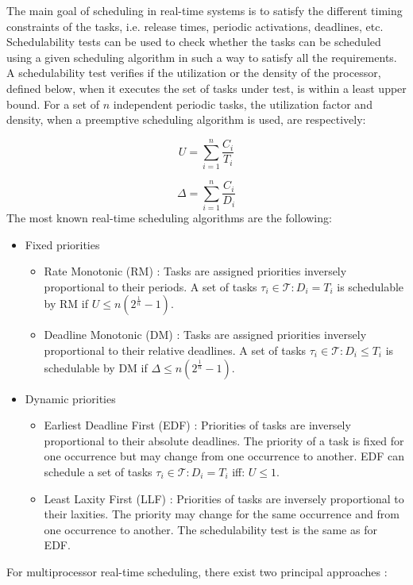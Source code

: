 The main goal of scheduling in real-time systems is to satisfy the different timing constraints of the tasks, i.e. release times, periodic activations, deadlines, etc. Schedulability tests can be used to check whether the tasks can be scheduled using a given scheduling algorithm in such a way to satisfy all the requirements. A schedulability test verifies if the utilization or the density of the processor, defined below, when it executes the set of tasks under test, is within a least upper bound. For a set of $n$ independent periodic tasks, the utilization factor and density, when a preemptive scheduling algorithm is used, are respectively:

\begin{equation}
U = \sum_{i=1}^{n}\frac{C_i}{T_i}
\end{equation}

\begin{equation}
\Delta = \sum_{i=1}^{n}\frac{C_i}{D_i}
\end{equation}
The most known real-time scheduling algorithms are the following:

\begin{itemize}
\item Fixed priorities
\begin{itemize}
\item Rate Monotonic (RM) \cite{liu:1973}: Tasks are assigned priorities inversely proportional to their periods. A set of tasks $\tau_i \in \mathcal{T}: D_i = T_i$ is schedulable by RM if $U \leq n(2^{\frac{1}{n}}-1)$. 
\item Deadline Monotonic (DM) \cite{leung:1982}: Tasks are assigned priorities inversely proportional to their relative deadlines. A set of tasks $\tau_i \in \mathcal{T}: D_i \leq T_i$ is schedulable by DM if $\Delta \leq n(2^{\frac{1}{n}}-1)$. 
\end{itemize}
\item Dynamic priorities
\begin{itemize}
\item Earliest Deadline First (EDF) \cite{liu:1973}: Priorities of tasks are inversely proportional to their absolute deadlines. The priority of a task is fixed for one occurrence but may change from one occurrence to another. EDF can schedule a set of tasks $\tau_i \in \mathcal{T}: D_i = T_i$ iff: $U \leq 1$.
\item Least Laxity First (LLF) \cite{mok:1983}: Priorities of tasks are inversely proportional to their laxities. The priority may change for the same occurrence and from one occurrence to another. The schedulability test is the same as for EDF.
\end{itemize}
\end{itemize}
 For multiprocessor real-time scheduling, there exist two principal approaches \cite{andersson:2000}:

